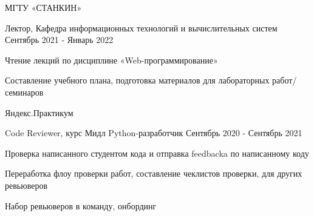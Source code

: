 \documentclass[a4paper]{article}
\begin{document}
\begin{company}
    \name МГТУ «СТАНКИН»

    \begin{position}
        \role Лектор, Кафедра информационных технологий и вычислительных систем
        \dates Сентябрь 2021 - Январь 2022

        \begin{responsibilities}
            \item Чтение лекций по дисциплине «Web-программирование»
            \item Составление учебного плана, подготовка материалов для лабораторных работ/семинаров
        \end{responsibilities}
    \end{position}
\end{company}

\newpage

\begin{company}
    \name Яндекс.Практикум

    \begin{position}
        \role Code Reviewer, курс Мидл Python-разработчик
        \dates Сентябрь 2020 - Сентябрь 2021

        \begin{responsibilities}
            \item Проверка написанного студентом кода и отправка feedback\textquotesingle{}a по написанному коду
            \item Переработка флоу проверки работ, составление чеклистов проверки, для других ревьюверов
            \item Набор ревьюверов в команду, онбординг
        \end{responsibilities}
    \end{position}
\end{company}
\end{document}

